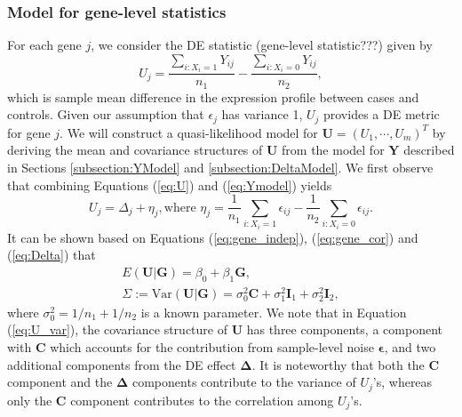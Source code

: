 \documentclass[a4,center,fleqn]{NAR}
\begin{document}
	\subsubsection{Model for gene-level statistics}\label{subsection:UModel}
	For each gene $j$, we consider the DE statistic (gene-level statistic???) given by 
	\begin{equation}
	\label{eq:U}
	U_j = \dfrac{\sum_{i: X_i=1}Y_{ij}}{n_1} - \dfrac{\sum_{i: X_i=0}Y_{ij}}{n_2},
	\end{equation}
	which is sample mean difference in the expression profile between cases and controls. Given our
	assumption that $\epsilon_j$ has variance 1, $U_j$ provides a DE metric for gene $j$. We will
	construct a quasi-likelihood model for $\bm U=(U_1,\cdots,U_m)^T$ by deriving the mean and
	covariance structures of $\bm U$ from the model for $\bm Y$ described in Sections
	\ref{subsection:YModel} and \ref{subsection:DeltaModel}. We first observe that combining Equations
	(\ref{eq:U}) and (\ref{eq:Ymodel}) yields
	\begin{equation} 
	U_j = \Delta_j + \eta_j, \text{where } \eta_j = \dfrac{1}{n_1}\sum_{i: X_i=1}\epsilon_{ij}-
	\dfrac{1}{n_2}\sum_{i: X_i=0}\epsilon_{ij}.
	\end{equation}
	It can be shown based on Equations (\ref{eq:gene_indep}), (\ref{eq:gene_cor}) and (\ref{eq:Delta})
	that
	\begin{gather}
	E(\bm U|\bm G) = \beta_0+\beta_1 \bm G,\label{eq:U_mean}\\
	\Sigma:=\mbox{Var}(\bm U|\bm G) = \sigma_0^2\bm C + \sigma_1^2\bm I_1+\sigma_2^2\bm
	I_2,\label{eq:U_var}
	\end{gather}
	where $\sigma_0^2=1/n_1+1/n_2$ is a known parameter. We note that in Equation (\ref{eq:U_var}), the
	covariance structure of $\bm U$ has three components, a component with $\bm C$ which accounts for
	the contribution from sample-level noise $\bm \epsilon$, and two additional components from the DE
	effect $\bm \Delta$. It is noteworthy that both the $\bm C$ component and the $\bm \Delta$
	components contribute to the variance of $U_j$'s, whereas only the $\bm C$ component contributes to
	the correlation among $U_j$'s.
	
\end{document}
